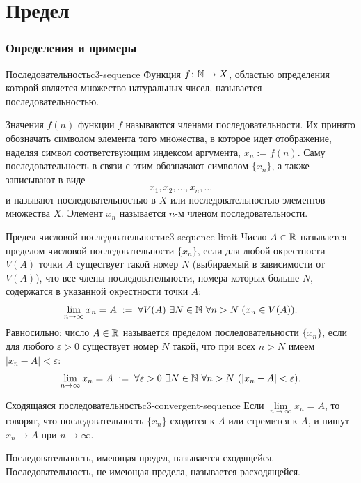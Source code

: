 \chapter{Предел}


\subsection{Определения и примеры}

\begin{definition}{Последовательность}{c3-sequence}
  Функция $f\colon\mathbb{N}\to X$, областью определения которой является множество
  натуральных чисел, называется последовательностью.

  Значения $f(n)$ функции $f$ называются членами последовательности. Их
  принято обозначать символом элемента того множества, в которое идет
  отображение, наделяя символ соответствующим индексом аргумента,
  $x_n:=f(n)$. Саму последовательность в связи с этим обозначают символом
  $\{x_n\}$, а также записывают в виде
  \[
    x_1,x_2,\ldots,x_n,\ldots
  \]
  и называют последовательностью в $X$ или последовательностью элементов
  множества $X$. Элемент $x_n$ называется $n$-м членом последовательности.
\end{definition}

\begin{definition}{Предел числовой последовательности}{c3-sequence-limit}
  Число $A\in\mathbb{R}$ называется пределом числовой последовательности
  $\{x_n\}$, если для любой окрестности $V(A)$ точки $A$ существует такой
  номер $N$ (выбираемый в зависимости от $V(A)$), что все члены
  последовательности, номера которых больше $N$, содержатся в указанной
  окрестности точки $A$:
  \[
    \lim_{n\to\infty}x_n=A
    \;:=\;
    \forall V(A)\ \exists N\in\mathbb{N}\ \forall n>N\;(x_n\in V(A)).
  \]
  Равносильно: число $A\in\mathbb{R}$ называется пределом последовательности
  $\{x_n\}$, если для любого $\varepsilon>0$ существует номер $N$ такой,
  что при всех $n>N$ имеем $|x_n-A|<\varepsilon$:
  \[
    \lim_{n\to\infty}x_n=A
    \;:=\;
    \forall\varepsilon>0\ \exists N\in\mathbb{N}\ \forall n>N\
    (|x_n-A|<\varepsilon).
  \]
\end{definition}

\begin{definition}{Сходящаяся последовательность}{c3-convergent-sequence}
  Если $\lim\limits_{n\to\infty}x_n=A$, то говорят, что последовательность
  $\{x_n\}$ сходится к $A$ или стремится к $A$, и пишут $x_n\to A$ при
  $n\to\infty$.

  Последовательность, имеющая предел, называется сходящейся.
  Последовательность, не имеющая предела, называется расходящейся.
\end{definition}

